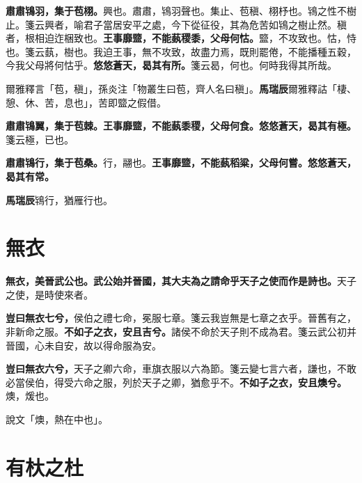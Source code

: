 \textbf{肅肅鴇羽，集于苞栩。}{\footnotesize 興也。肅肅，鴇羽聲也。集止、苞稹、栩杼也。鴇之性不樹止。箋云興者，喻君子當居安平之處，今下從征役，其為危苦如鴇之樹止然。稹者，根相迫迮梱致也。}\textbf{王事靡盬，不能蓺稷黍，父母何怙。}{\footnotesize 盬，不攻致也。怙，恃也。箋云蓺，樹也。我迫王事，無不攻致，故盡力焉，既則罷倦，不能播種五穀，今我父母將何怙乎。}\textbf{悠悠蒼天，曷其有所。}{\footnotesize 箋云曷，何也。何時我得其所哉。}

\begin{quoting}爾雅釋言「苞，稹」，孫炎注「物叢生曰苞，齊人名曰稹」。\textbf{馬瑞辰}爾雅釋詁「棲、憩、休、苦，息也」，苦即盬之假借。\end{quoting}

\textbf{肅肅鴇翼，集于苞棘。王事靡盬，不能蓺黍稷，父母何食。悠悠蒼天，曷其有極。}{\footnotesize 箋云極，已也。}

\textbf{肅肅鴇行，集于苞桑。}{\footnotesize 行，翮也。}\textbf{王事靡盬，不能蓺稻粱，父母何嘗。悠悠蒼天，曷其有常。}

\begin{quoting}\textbf{馬瑞辰}鴇行，猶雁行也。\end{quoting}

\section{無衣}


\textbf{無衣，美晉武公也。武公始并晉國，其大夫為之請命乎天子之使而作是詩也。}{\footnotesize 天子之使，是時使來者。}

\textbf{豈曰無衣七兮，}{\footnotesize 侯伯之禮七命，冕服七章。箋云我豈無是七章之衣乎。晉舊有之，非新命之服。}\textbf{不如子之衣，安且吉兮。}{\footnotesize 諸侯不命於天子則不成為君。箋云武公初并晉國，心未自安，故以得命服為安。}

\textbf{豈曰無衣六兮，}{\footnotesize 天子之卿六命，車旗衣服以六為節。箋云變七言六者，謙也，不敢必當侯伯，得受六命之服，列於天子之卿，猶愈乎不。}\textbf{不如子之衣，安且燠兮。}{\footnotesize 燠，煖也。}

\begin{quoting}說文「燠，熱在中也」。\end{quoting}

\section{有杕之杜}


